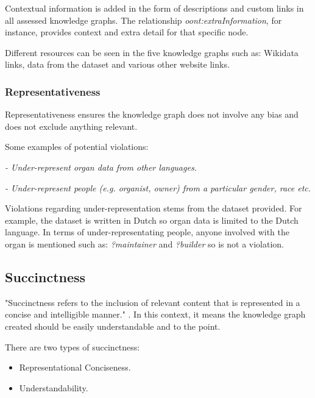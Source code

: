 Contextual information is added in the form of descriptions and custom links in all assessed knowledge graphs. The relationship \textit{oont:extraInformation}, for instance, provides context and extra detail for that specific node. 

Different resources can be seen in the five knowledge graphs such as: Wikidata links, data from the dataset and various other website links. 

\subsubsection{Representativeness}
\hspace{0.5cm} Representativeness ensures the knowledge graph does not involve any bias and does not exclude anything relevant. \cite{knowledgegraphevaulationbook}

\noindent Some examples of potential violations: 

\vspace{-0.05cm}
\begin{displayquote}
    \textit{- Under-represent organ data from other languages.}
\end{displayquote}  
\vspace{-0.4cm}
\begin{displayquote}
     \textit{- Under-represent people (e.g. organist, owner) from a particular gender, race etc. }  
\end{displayquote}

Violations regarding under-representation stems from the dataset provided. For example, the dataset is written in Dutch so organ data is limited to the Dutch language. In terms of under-representating people, anyone involved with the organ is mentioned such as: \textit{?maintainer} and \textit{?builder} so is not a violation. 

\subsection{Succinctness}
\hspace{0.5cm} "Succinctness refers to the inclusion of relevant content that is represented in a concise and intelligible manner." \cite{knowledgegraphevaulationbook}. In this context, it means the knowledge graph created should be easily understandable and to the point. 

\noindent There are two types of succinctness: 

\vspace{-0.1cm}
\begin{itemize}
    \itemsep0em 
\item Representational Conciseness.
\vspace{-0.1cm}
\item Understandability.
\end{itemize}
\vspace{-0.4cm}

